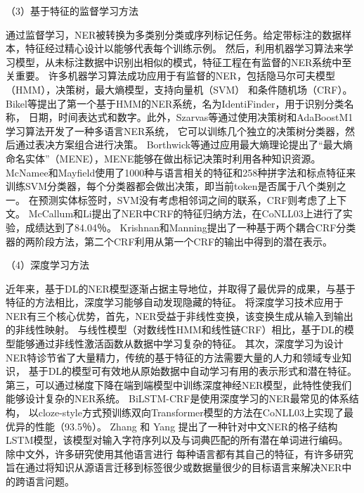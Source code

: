 （3）基于特征的监督学习方法

通过监督学习，NER被转换为多类别分类或序列标记任务。给定带标注的数据样本，特征经过精心设计以能够代表每个训练示例。
然后，利用机器学习算法来学习模型，从未标注数据中识别出相似的模式，特征工程在有监督的NER系统中至关重要。
许多机器学习算法成功应用于有监督的NER，包括隐马尔可夫模型（HMM），决策树，最大熵模型，支持向量机（SVM）
和条件随机场（CRF）。 Bikel等提出了第一个基于HMM的NER系统，名为IdentiFinder，用于识别分类名称，
日期，时间表达式和数字\cite{bikel1998nymble,bikel1999algorithm}。此外，Szarvas等通过使用决策树和AdaBoostM1学习算法开发了一种多语言NER系统，
它可以训练几个独立的决策树分类器，然后通过表决方案组合进行决策\cite{szarvas2006multilingual}。 
Borthwick等通过应用最大熵理论提出了“最大熵命名实体”（MENE），MENE能够在做出标记决策时利用各种知识资源。
 McNamee和Mayfield使用了1000种与语言相关的特征和258种拼字法和标点特征来训练SVM分类器，每个分类器都会做出决策，即当前token是否属于八个类别之一\cite{mcnamee2002entity}。
 在预测实体标签时，SVM没有考虑相邻词之间的联系，CRF则考虑了上下文。 
 McCallum和Li提出了NER中CRF的特征归纳方法，在CoNLL03上进行了实验，成绩达到了84.04％\cite{mccallum2003early}。 
 Krishnan和Manning提出了一种基于两个耦合CRF分类器的两阶段方法，第二个CRF利用从第一个CRF的输出中得到的潜在表示\cite{krishnan2006effective}。

 （4）深度学习方法

 近年来，基于DL的NER模型逐渐占据主导地位，并取得了最优异的成果，与基于特征的方法相比，深度学习能够自动发现隐藏的特征。 
 将深度学习技术应用于NER有三个核心优势，首先，NER受益于非线性变换，该变换生成从输入到输出的非线性映射。
 与线性模型（对数线性HMM和线性链CRF）相比，基于DL的模型能够通过非线性激活函数从数据中学习复杂的特征。
 其次，深度学习为设计NER特诊节省了大量精力，传统的基于特征的方法需要大量的人力和领域专业知识，
 基于DL的模型可有效地从原始数据中自动学习有用的表示形式和潜在特征。
 第三，可以通过梯度下降在端到端模型中训练深度神经NER模型，此特性使我们能够设计复杂的NER系统。
 BiLSTM-CRF是使用深度学习的NER最常见的体系结构，
 以cloze-style方式预训练双向Transformer模型的方法在CoNLL03上实现了最优异的性能（93.5％）\cite{baevski2019cloze}。 
 Zhang 和 Yang 提出了一种针对中文NER的格子结构LSTM模型，该模型对输入字符序列以及与词典匹配的所有潜在单词进行编码\cite{zhang2018chinese}。
 除中文外，许多研究使用其他语言进行
 每种语言都有其自己的特征，有许多研究旨在通过将知识从源语言迁移到标签很少或数据量很少的目标语言来解决NER中的跨语言问题。


